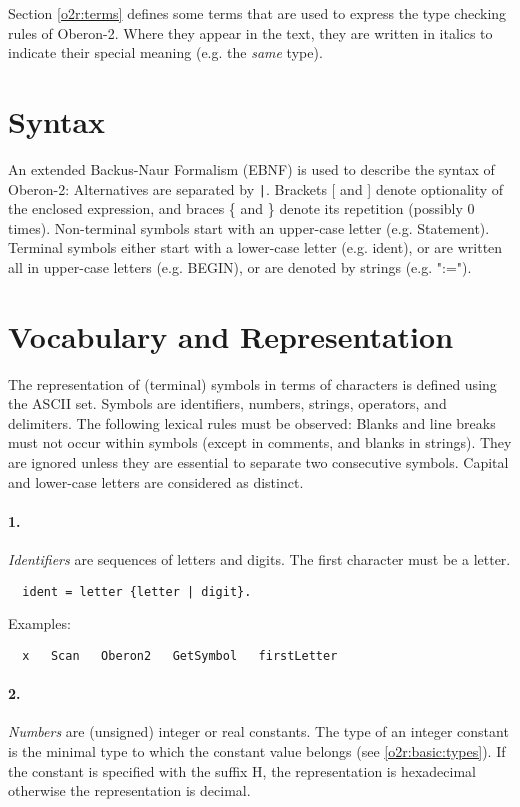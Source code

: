 Section \ref{o2r:terms}
defines some terms that are used to express the type
checking rules of Oberon-2. Where they appear in the text, they are
written in italics to indicate their special meaning (e.g. the {\em same}
type).

\section{Syntax}

An extended Backus-Naur Formalism (EBNF) is used to describe the syntax
of Oberon-2: Alternatives are separated by \verb+|+. Brackets [ and ] denote
optionality of the enclosed expression, and braces \{ and \} denote
its repetition (possibly 0 times). Non-terminal symbols start with
an upper-case letter (e.g. Statement). Terminal symbols either start
with a lower-case letter (e.g. ident), or are written all in upper-case
letters (e.g. BEGIN), or are denoted by strings (e.g. ":=").

\section{Vocabulary and Representation}

The representation of (terminal) symbols in terms of characters is
defined using the ASCII set. Symbols are identifiers, numbers, strings,
operators, and delimiters. The following lexical rules must be observed:
Blanks and line breaks must not occur within symbols (except in comments,
and blanks in strings). They are ignored unless they are essential
to separate two consecutive symbols. Capital and lower-case letters
are considered as distinct.

\paragraph{\rm 1.} {\em Identifiers} are sequences of letters and
digits. The first character must be a letter.
{\BNFsize
\begin{verbatim}
  ident = letter {letter | digit}.
\end{verbatim}}

\noindent
Examples:
\begin{verbatim}
  x   Scan   Oberon2   GetSymbol   firstLetter
\end{verbatim}

\paragraph{\rm 2.} {\em Numbers} are (unsigned) integer or real constants.
The type of an integer constant is the minimal type to which the constant
value belongs (see \ref{o2r:basic:types}). If the constant
is specified with the suffix H, the representation is hexadecimal
otherwise the representation is decimal.

